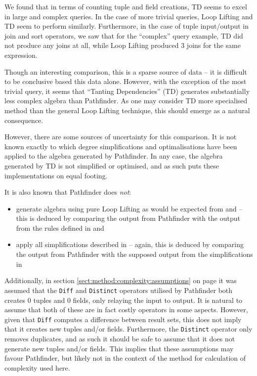 We found that in terms of counting tuple and field creations, TD seems to excel
in large and complex queries. In the case of more trivial queries, Loop Lifting
and TD seem to perform similarly. Furthermore, in the case of tuple
input/output in join and sort operators, we saw that for the ``complex'' query
example, TD did not produce any joins at all, while Loop Lifting produced 3
joins for the same expression.

Though an interesting comparison, this is a sparse source of data -- it
is difficult to be conclusive based this data alone. However, with the
exception of the most trivial query, it seems that ``Tanting Dependencies'' (TD)
generates substantially less complex algebra than Pathfinder. As one
may consider TD more specialised method than the general Loop Lifting
technique, this should emerge as a natural consequence.

However, there are some sources of uncertainty for this comparison. It is not
known exactly to which degree simplifications and optimalisations have been
applied to the algebra generated by Pathfinder. In any case, the
algebra generated by TD is not simplified or optimised, and as such puts these
implementations on equal footing. 

It is also known that Pathfinder does \emph{not}:
\begin{itemize}
  \item generate algebra using pure Loop Lifting as would be expected from
  \cite{pathfinder_mothertongue} and \cite{pathfinder_purelyRelational} -- this
  is deduced by comparing the output from Pathfinder with the output
  from the rules defined in \cite{pathfinder_mothertongue} and
  \cite{pathfinder_purelyRelational}
  \item apply all simplifications described in
  \cite{pathfinder_purelyRelational} -- again, this is deduced by comparing the
  output from Pathfinder with the supposed output from the simplifications in
  \cite{pathfinder_purelyRelational}
\end{itemize}

Additionally, in section \ref{sect:method:complexity:assumptions} on page
\pageref{sect:method:complexity:assumptions} it was assumed that
the \texttt{Diff} and \texttt{Distinct} operators utilised by Pathfinder both
creates 0 tuples and 0 fields, only relaying the input to output. It is
natural to assume that both of these are in fact costly operators in some
aspects. However, given that \texttt{Diff} computes a difference between
result sets, this does not imply that it creates new tuples and/or fields.
Furthermore, the \texttt{Distinct} operator only removes duplicates, and as
such it should be safe to assume that it does not generate new tuples and/or
fields. This implies that these assumptions may favour Pathfinder, but likely
not in the context of the method for calculation of complexity used here.

